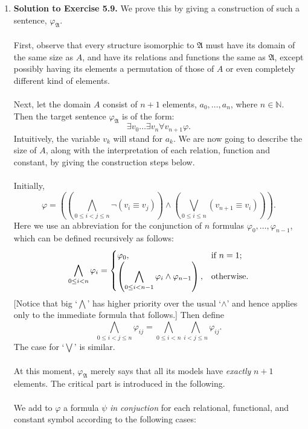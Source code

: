 \begin{enumerate}[1.]
\item \textbf{Solution to Exercise 5.9.} We prove this by giving a construction of such a sentence, $\varphi_{\mathfrak{A}}$.\\
\ 
\\First, observe that every structure isomorphic to $\mathfrak{A}$ must have its domain of the same size as $A$, and have its relations and functions the same as $\mathfrak{A}$, except possibly having its elements a permutation of those of $A$ or even completely different kind of elements.\\
\ 
\\Next, let the domain $A$ consist of $n+1$ elements, $a_0 , \ldots , a_n$, where $n \in \mathbb{N}$. Then the target sentence $\varphi_{\mathfrak{A}}$ is of the form:
\[
\exists v_0 \ldots \exists v_n \forall v_{n+1} \varphi .
\]
Intuitively, the variable $v_k$ will stand for $a_k$. We are now going to describe the size of $A$, along with the interpretation of each relation, function and constant, by giving the construction steps below.\\
\ 
\\Initially,
\[
\varphi = \left ( \left ( \bigwedge_{0 \leq i < j \leq n} \neg ( v_i \equiv v_j ) \right ) \land \left ( \bigvee_{0 \leq i \leq n} ( v_{n+1} \equiv v_i ) \right ) \right ) .
\]
Here we use an abbreviation for the conjunction of $n$ formulas $\varphi_0 , \ldots , \varphi_{n-1}$, which can be defined recursively as follows:
\[
\bigwedge_{0 \leq i < n} \varphi_i = \begin{cases}
\varphi_0, & \mbox{if \(n = 1\)}; \cr
\displaystyle\left(\bigwedge_{0 \leq i < n - 1} \varphi_i \land \varphi_{n - 1} \right), & \mbox{otherwise}. \cr
\end{cases}
\]
[Notice that big `$\bigwedge$' has higher priority over the usual `$\land$' and hence applies only to the immediate formula that follows.] Then define
\[
\bigwedge_{0 \leq i < j \leq n} \varphi_{ij} = \bigwedge_{0 \leq i < n} \bigwedge_{i < j \leq n} \varphi_{ij} .
\]
The case for `$\bigvee$' is similar.\\
\ 
\\At this moment, $\varphi_{\mathfrak{A}}$ merely says that all its models have \textit{exactly} $n+1$ elements. The critical part is introduced in the following.\\
\ 
\\We add to $\varphi$ a formula $\psi$ \textit{in conjuction} for each relational, functional, and constant symbol according to the following cases:
\begin{enumerate}[(i)]

\end{enumerate}
\end{enumerate}
